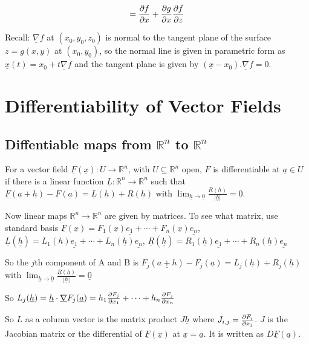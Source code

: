 \[= \diffp{f}{x} + \diffp{g}{x}\diffp{f}{z}\]

Recall: $\underline{\nabla} f$ at $(x_0, y_0, z_0)$ is normal to the tangent plane of the surface $z = g(x, y)$ at $(x_0, y_0)$, so the normal line is given in parametric form as $\underline{x}(t) = x_0 + t \underline{\nabla} f$ and the tangent plane is given by $(\underline{x} - x_0) . \underline{\nabla} f = 0$.

\section{Differentiability of Vector Fields}

\subsection{Diffentiable maps from $\mathbb{R}^n$ to $\mathbb{R}^n$}

\begin{definition}
	For a vector field $\underline{F}(\underline{x}): U \rightarrow \mathbb{R}^n$, with $U \subseteq \mathbb{R}^n$ open, $F$ is differentiable at $\underline{a} \in U$ if there is a linear function $\underline{L}: \mathbb{R}^n \rightarrow \mathbb{R}^n$ such that $\underline{F}(\underline{a} + \underline{h}) - \underline{F}(\underline{a}) = \underline{L}(\underline{h}) + \underline{R}(\underline{h})$ with $\lim_{\underline{h} \rightarrow \underline{0}} \frac{\underline{R}(\underline{h})}{|\underline{h}|} = \underline{0}$.

	Now linear maps $\mathbb{R}^n \rightarrow \mathbb{R}^n$ are given by matrices. To see what matrix, use standard basis $\underline{F}(\underline{x}) = F_1(\underline{x}) \underline{e_1} + \cdots + F_n(\underline{x}) \underline{e_n}$, $\underline{L}(\underline{\underline{h}}) = L_1(h) \underline{e_1} + \cdots + L_n(\underline{h}) \underline{e_n}$, $\underline{R}(\underline{\underline{h}}) = R_1(\underline{h}) \underline{e_1} + \cdots + R_n(\underline{h}) \underline{e_n}$

	So the $j$th component of A and B is $F_j(\underline{a + h}) - F_j(\underline{a}) = L_j(\underline{h}) + R_j(\underline{h})$ with $\lim_{\underline{h} \rightarrow \underline{0}} \frac{\underline{R}(\underline{h})}{|\underline{h}|} = \underline{0}$

	So $L_j(\underline{h}) = \underline{h} \cdot \underline{\nabla} F_j(\underline{a}) = h_1 \diffp{F_j}{x_1} + \cdots + h_n \diffp{F_j}{x_n}$

	So $L$ as a column vector is the matrix product $J \underline{h}$ where $J_{i, j} = \diffp{F_i}{x_j}$. $J$ is the Jacobian matrix or the differential of $\underline{F}(\underline{x})$ at $\underline{x} = \underline{a}$. It is written as $D\underline{F}(\underline{a})$.
\end{definition}

